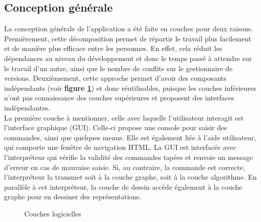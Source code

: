 \documentclass[french]{article}
\begin{document}
		\subsection{Conception générale}
		La conception générale de l'application a été faite en couches pour deux raisons. Premièrement, cette décomposition permet de répartir le travail plus facilement et de manière plus efficace entre les personnes. En effet, cela réduit les dépendances au niveau du développement et donc le temps passé à attendre sur le travail d'un autre, ainsi que le nombre de conflits sur le gestionnaire de versions. Deuxièmement, cette approche permet d'avoir des composants indépendants (voir \textbf{figure \ref{couchesLogicielles}}) et donc réutilisables, puisque les couches inférieures n'ont pas connaissance des couches supérieures et proposent des interfaces indépendantes.\\
		La première couche à mentionner, celle avec laquelle l'utilisateur interagit est l'interface graphique (GUI). Celle-ci propose une console pour saisir des commandes, ainsi que quelques menus. Elle est également liée à l'aide utilisateur, qui comporte une fenêtre de navigation HTML. La GUI est interfacée avec l'interpréteur qui vérifie la validité des commandes tapées et renvoie un message d'erreur en cas de mauvaise saisie. Si, au contraire, la commande est correcte, l'interpréteur la transmet soit à la couche graphe, soit à la couche algorithme. En parallèle à cet interpréteur, la couche de dessin accède également à la couche graphe pour en dessiner des représentations.
		
		\begin{figure}[H]
			\centering
			\caption{Couches logicielles}
			\label{couchesLogicielles}
		\end{figure}
	
\end{document}
